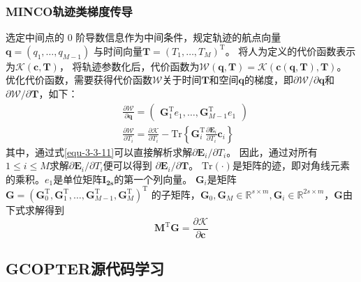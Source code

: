 \subsubsection{MINCO轨迹类梯度传导}
    选定中间点的 0 阶导数信息作为中间条件，规定轨迹的航点向量\(\mathbf{q}=(q_1,\ldots,q_{M-1})\)
    与时间向量\(\mathbf{T}=(T_1,\ldots,T_M)^\mathrm{T}\)。
    将人为定义的代价函数表示为\(\mathcal{K}(\mathbf{c},\mathbf{T})\)，
    将轨迹参数化后，代价函数为\(\mathcal{W}(\mathbf{q},\mathbf{T})=\mathcal{K}(\mathbf{c}(\mathbf{q},\mathbf{T}),\mathbf{T})\)。
    优化代价函数，需要获得代价函数\(\mathcal{W}\)关于时间\(\mathbf{T}\)和空间\(\mathbf{q}\)的梯度，即\(\partial\mathcal{W}/\partial\mathbf{q}\)和
    \(\partial\mathcal{W}/\partial\mathbf{T}\)，如下：
    \begin{align}
        &\frac{\partial\mathcal{W}}{\partial\mathbf{q}}=\begin{pmatrix}\mathbf{G}_1^\mathrm{T}e_1,\ldots,\mathbf{G}_{M-1}^\mathrm{T}e_1\end{pmatrix}\label{equ-3-5-2} \\  
        &\frac{\partial\mathcal{W}}{\partial T_i}=\frac{\partial\mathcal{K}}{\partial T_i}-\mathrm{Tr}\left\{\mathbf{G}_i^\mathrm{T}\frac{\partial\mathbf{E}_i}{\partial T_i}\mathbf{c}_i\right\}\label{equ-3-5-3}
    \end{align}
    其中，通过式\eqref{equ-3-3-11}可以直接解析求解\(\partial\mathbf{E}_i/\partial T_i\)。
    因此，通过对所有\(1\leq i\leq M\)求解\(\partial\mathbf{E}_i/\partial T_i\)便可以得到
    \(\partial\mathbf{E}_i/\partial \mathbf{T}\)。
    \(\mathrm{Tr}(\cdot )\)是矩阵的迹，即对角线元素的乘积。\(e_1\)是单位矩阵\(\mathbf{I_{2s}}\)的第一个列向量。
    \(\mathbf{G}_i\)是矩阵\(\mathbf{G}=\left(\mathbf{G}_{0}^{{\mathrm{T}}},\mathbf{G}_{1}^{{\mathrm{T}}},\ldots,\mathbf{G}_{M-1}^{{\mathrm{T}}},\mathbf{G}_{M}^{{\mathrm{T}}}\right)^{{\mathrm{T}}}\)
    的子矩阵，\(\mathbf{G}_0,\mathbf{G}_M\in\mathbb{R}^{s\times m},\mathbf{G}_i\in\mathbb{R}^{2s\times m}\)，\(\mathbf{G}\)由下式求解得到
    \begin{equation}\label{equ-3-5-4} 
        \mathbf{M}^\mathrm{T}\mathbf{G}=\frac{\partial\mathcal{K}}{\partial\mathbf{c}}
    \end{equation}

\subsection{GCOPTER源代码学习}		
